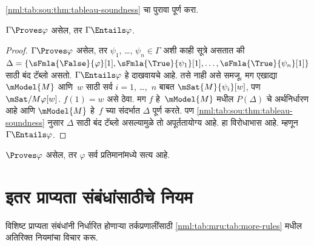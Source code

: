 \begin{prob}
\ref{nml:tab:sou:thm:tableau-soundness} चा
पुरावा पूर्ण करा.
\end{prob}

\begin{cor}
\label{nml:tab:sou:cor:entailment-soundness}
$\Gamma \Proves \varphi$ असेल, तर
$\Gamma \Entails \varphi$.
\end{cor}

\begin{proof}
  $\Gamma \Proves \varphi$ असेल, तर
  $\psi_1$, \dots, $\psi_n \in \Gamma$ अशी काही सूत्रे
  असतात की $\Delta =
  \{\sFmla{\False}{\varphi}[1], \sFmla{\True}{\psi_1}[1],
  \dots, \sFmla{\True}{\psi_n}[1]\}$ साठी
  बंद टॅब्लो असतो.
  $\Gamma \Entails \varphi$ हे दाखवायचे आहे.
  तसे नाही असे समजू. मग एखाद्या
  $\mModel{M}$ आणि~$w$ साठी सर्व
  $i=1$, \dots,~$n$ बाबत
  $\mSat{M}{\psi_i}[w]$, पण
  $\mSat/{M}{\varphi}[w]$. $f(1) = w$
  असे ठेवा. मग $f$ हे~$\mModel{M}$ मधील
  $P(\Delta)$ चे अर्थनिर्धारण आहे आणि
  $\mModel{M}$ हे~$f$ च्या संदर्भात
  $\Delta$ पूर्ण करते. पण
  \ref{nml:tab:sou:thm:tableau-soundness} नुसार
  $\Delta$ साठी बंद टॅब्लो असल्यामुळे
  तो अपूर्ततायोग्य आहे. हा विरोधाभास आहे.
  म्हणून $\Gamma \Entails \varphi$.
\end{proof}

\begin{cor}
\label{nml:tab:sou:cor:weak-soundness}
$\Proves \varphi$ असेल, तर $\varphi$ सर्व
प्रतिमानांमध्ये सत्य आहे.
\end{cor}













\section{इतर प्राप्यता संबंधांसाठीचे नियम}\label{nml:tab:mru:sec}

विशिष्ट प्राप्यता संबंधांनी निर्धारित होणाऱ्या
तर्कप्रणालींसाठी \ref{nml:tab:mru:tab:more-rules} मधील
अतिरिक्त नियमांचा विचार करू.

